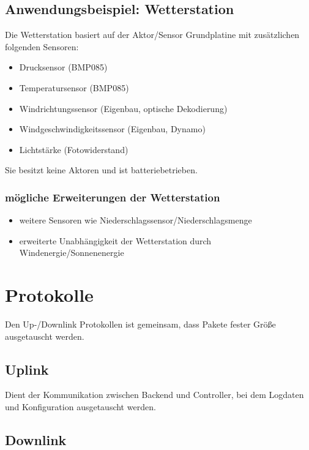 \documentclass[12pt,a4paper]{article}
\begin{document}
\subsection{Anwendungsbeispiel: Wetterstation}

Die Wetterstation basiert auf der Aktor/Sensor Grundplatine mit zusätzlichen folgenden Sensoren:

\begin{itemize}
	\item Drucksensor (BMP085)
	\item Temperatursensor (BMP085)
	\item Windrichtungssensor (Eigenbau, optische Dekodierung)
	\item Windgeschwindigkeitssensor (Eigenbau, Dynamo)
	\item Lichtstärke (Fotowiderstand)
\end{itemize}

Sie besitzt keine Aktoren und ist batteriebetrieben.

\subsubsection{mögliche Erweiterungen der Wetterstation}

\begin{itemize}
	\item weitere Sensoren wie Niederschlagssensor/Niederschlagsmenge
	\item erweiterte Unabhängigkeit der Wetterstation durch Windenergie/Sonnenenergie
\end{itemize}

\section{Protokolle}

Den Up-/Downlink Protokollen ist gemeinsam, dass Pakete fester Größe ausgetauscht werden.

\subsection{Uplink}
\label{subsec:uplink}

Dient der Kommunikation zwischen Backend und Controller, bei dem Logdaten und Konfiguration ausgetauscht werden.

\subsection{Downlink}
\label{subsec:downlink}
\end{document}
